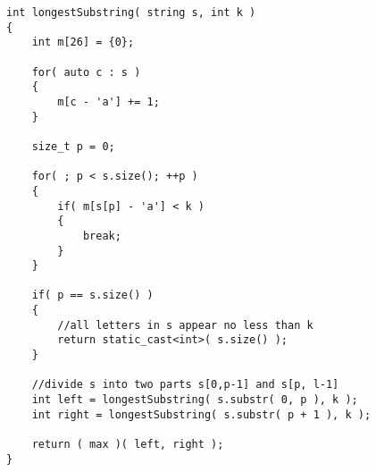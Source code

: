 \begin{lstlisting}[style=customc, caption={Recursion}]
int longestSubstring( string s, int k )
{
    int m[26] = {0};

    for( auto c : s )
    {
        m[c - 'a'] += 1;
    }

    size_t p = 0;

    for( ; p < s.size(); ++p )
    {
        if( m[s[p] - 'a'] < k )
        {
            break;
        }
    }

    if( p == s.size() )
    {
        //all letters in s appear no less than k
        return static_cast<int>( s.size() );
    }

    //divide s into two parts s[0,p-1] and s[p, l-1]
    int left = longestSubstring( s.substr( 0, p ), k );
    int right = longestSubstring( s.substr( p + 1 ), k );

    return ( max )( left, right );
}
\end{lstlisting}